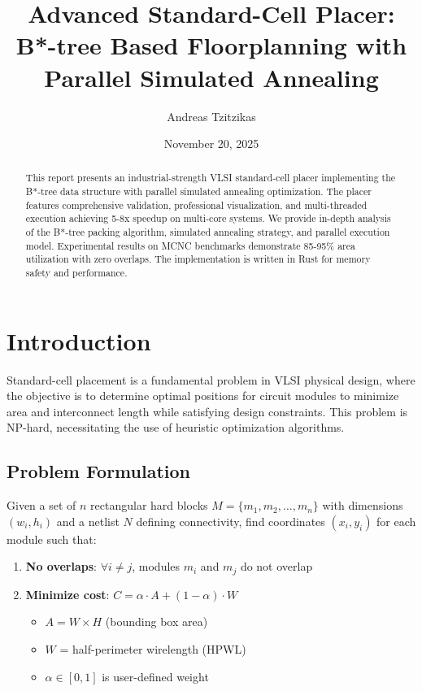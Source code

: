 \documentclass[11pt]{article}
\title{Advanced Standard-Cell Placer:\\B*-tree Based Floorplanning with Parallel Simulated Annealing}
\author{Andreas Tzitzikas}
\date{November 20, 2025}
\begin{document}
\maketitle

\begin{abstract}
This report presents an industrial-strength VLSI standard-cell placer implementing the B*-tree data structure with parallel simulated annealing optimization. The placer features comprehensive validation, professional visualization, and multi-threaded execution achieving 5-8x speedup on multi-core systems. We provide in-depth analysis of the B*-tree packing algorithm, simulated annealing strategy, and parallel execution model. Experimental results on MCNC benchmarks demonstrate 85-95\% area utilization with zero overlaps. The implementation is written in Rust for memory safety and performance.
\end{abstract}

\tableofcontents
\newpage

\section{Introduction}

Standard-cell placement is a fundamental problem in VLSI physical design, where the objective is to determine optimal positions for circuit modules to minimize area and interconnect length while satisfying design constraints. This problem is NP-hard, necessitating the use of heuristic optimization algorithms.

\subsection{Problem Formulation}

Given a set of $n$ rectangular hard blocks $M = \{m_1, m_2, \ldots, m_n\}$ with dimensions $(w_i, h_i)$ and a netlist $N$ defining connectivity, find coordinates $(x_i, y_i)$ for each module such that:

\begin{enumerate}
    \item \textbf{No overlaps}: $\forall i \neq j$, modules $m_i$ and $m_j$ do not overlap
    \item \textbf{Minimize cost}: $C = \alpha \cdot A + (1-\alpha) \cdot W$
    \begin{itemize}
        \item $A = W \times H$ (bounding box area)
        \item $W$ = half-perimeter wirelength (HPWL)
        \item $\alpha \in [0,1]$ is user-defined weight
    \end{itemize}
\end{enumerate}
\end{document}
